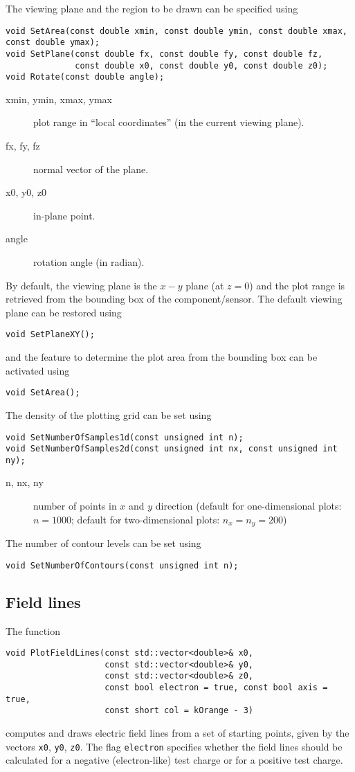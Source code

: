 The viewing plane and the region to be drawn 
can be specified using
\begin{lstlisting}
void SetArea(const double xmin, const double ymin, const double xmax, const double ymax);
void SetPlane(const double fx, const double fy, const double fz,
              const double x0, const double y0, const double z0);
void Rotate(const double angle);
\end{lstlisting}
\begin{description}
  \item[xmin, ymin, xmax, ymax] plot range in ``local coordinates'' (in the current viewing plane).
  \item[fx, fy, fz] normal vector of the plane.
  \item[x0, y0, z0] in-plane point.
  \item[angle] rotation angle (in radian).
\end{description}
By default, the viewing plane is the $x-y$ plane (at $z = 0$) and the 
plot range is retrieved from the bounding box of the component/sensor.
The default viewing plane can be restored using 
\begin{lstlisting}
void SetPlaneXY();
\end{lstlisting}
and the feature to determine the plot area from the bounding box can be activated using 
\begin{lstlisting}
void SetArea();
\end{lstlisting}
 
The density of the plotting grid can be set using
\begin{lstlisting}
void SetNumberOfSamples1d(const unsigned int n);
void SetNumberOfSamples2d(const unsigned int nx, const unsigned int ny);
\end{lstlisting}
\begin{description}
  \item[n, nx, ny]
  number of points in \(x\) and \(y\) direction 
  (default for one-dimensional plots: \(n = 1000\);
   default for two-dimensional plots: \(n_{x} = n_{y} = 200\)) 
\end{description}

The number of contour levels can be set using
\begin{lstlisting}
void SetNumberOfContours(const unsigned int n);
\end{lstlisting}

\subsection{Field lines}
The function
\begin{lstlisting}
void PlotFieldLines(const std::vector<double>& x0,
                    const std::vector<double>& y0,
                    const std::vector<double>& z0,
                    const bool electron = true, const bool axis = true,
                    const short col = kOrange - 3)
\end{lstlisting}
computes and draws electric field lines from a set of starting points, 
given by the vectors \texttt{x0}, \texttt{y0}, \texttt{z0}. 
The flag \texttt{electron} specifies whether the field lines should 
be calculated for a negative (electron-like) test charge 
or for a positive test charge.


